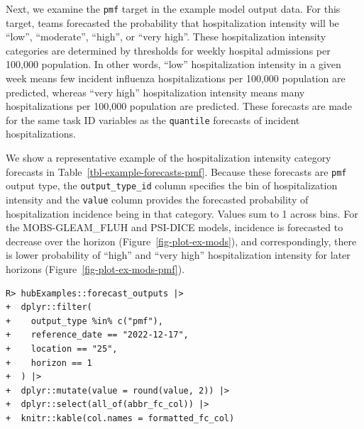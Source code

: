 \documentclass[
  article,
  shortnames,
  notitle]{jss}
\begin{document}
Next, we examine the \texttt{pmf} target in the example model output
data. For this target, teams forecasted the probability that
hospitalization intensity will be ``low'', ``moderate'', ``high'', or
``very high''. These hospitalization intensity categories are determined
by thresholds for weekly hospital admissions per 100,000 population. In
other words, ``low'' hospitalization intensity in a given week means few
incident influenza hospitalizations per 100,000 population are
predicted, whereas ``very high'' hospitalization intensity means many
hospitalizations per 100,000 population are predicted. These forecasts
are made for the same task ID variables as the \texttt{quantile}
forecasts of incident hospitalizations.

We show a representative example of the hospitalization intensity
category forecasts in Table~\ref{tbl-example-forecasts-pmf}. Because
these forecasts are \texttt{pmf} output type, the
\texttt{output\_type\_id} column specifies the bin of hospitalization
intensity and the \texttt{value} column provides the forecasted
probability of hospitalization incidence being in that category. Values
sum to 1 across bins. For the MOBS-GLEAM\_FLUH and PSI-DICE models,
incidence is forecasted to decrease over the horizon
(Figure~\ref{fig-plot-ex-mods}), and correspondingly, there is lower
probability of ``high'' and ``very high'' hospitalization intensity for
later horizons (Figure~\ref{fig-plot-ex-mods-pmf}).

\begin{verbatim}
R> hubExamples::forecast_outputs |>
+  dplyr::filter(
+    output_type %in% c("pmf"),
+    reference_date == "2022-12-17",
+    location == "25",
+    horizon == 1
+  ) |>
+  dplyr::mutate(value = round(value, 2)) |>
+  dplyr::select(all_of(abbr_fc_col)) |>
+  knitr::kable(col.names = formatted_fc_col)
\end{verbatim}
\end{document}
